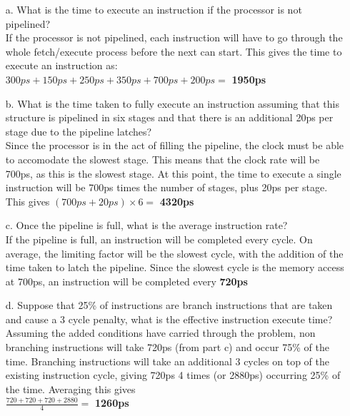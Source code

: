 \documentclass[letterpaper,10pt,onecolumn,titlepage]{article}
\begin{document}
\begin{enumerate}
	\begin{enumerate}
		\item[a.] What is the time to execute an instruction if the processor is
			not pipelined? \\
			If the processor is not pipelined, each instruction will have to
			go through the whole fetch/execute process before the next can
			start. This gives the time to execute an instruction as: \\
			$300ps + 150ps + 250ps + 350ps + 700ps + 200ps =$ \textbf{1950ps}
		\item[b.] What is the time taken to fully execute an instruction assuming
			that this structure is pipelined in six stages and that there is an
			additional 20ps per stage due to the pipeline latches?\\
			Since the processor is in the act of filling the pipeline, the
			clock must be able to accomodate the slowest stage. This means
			that the clock rate will be 700ps, as this is the slowest stage.
			At this point, the time to execute a single instruction will be
			700ps times the number of stages, plus 20ps per stage. This gives
			$(700ps + 20ps) \times 6 =$ \textbf{4320ps}
		\item[c.] Once the pipeline is full, what is the average instruction
			rate?\\
			If the pipeline is full, an instruction will be completed every
			cycle. On average, the limiting factor will be the slowest cycle,
			with the addition of the time taken to latch the pipeline.
			Since the slowest cycle is the memory access at 700ps, an 
			instruction will be completed every \textbf{720ps}
		\item[d.] Suppose that 25\% of instructions are branch instructions that
			are taken and cause a 3 cycle penalty, what is the effective
			instruction execute time?\\
			Assuming the added conditions have carried through the problem,
			non branching instructions will take 720ps (from part c) and occur
			75\% of the time. Branching instructions will take an additional 3
			cycles on top of the existing instruction cycle, giving 720ps 4
			times (or 2880ps) occurring 25\% of the time. Averaging this
			gives\\
			$\frac{720+720+720+2880}{4} =$ \textbf{1260ps}
	\end{enumerate}


\end{enumerate}
\end{document}
